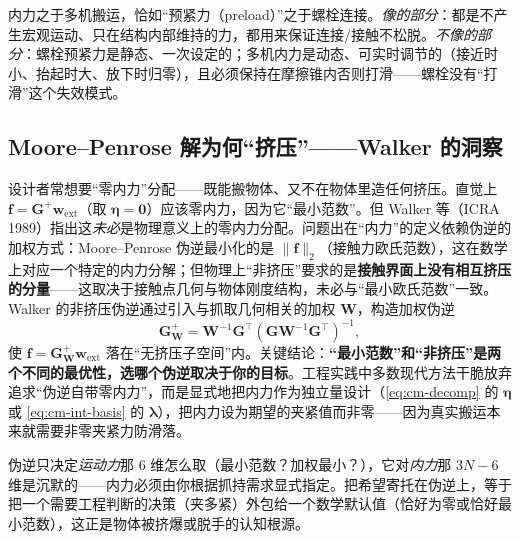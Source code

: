 \begin{note}
内力之于多机搬运，恰如“预紧力（preload）”之于螺栓连接。\emph{像的部分}：都是不产生宏观运动、只在结构内部维持的力，都用来保证连接/接触不松脱。\emph{不像的部分}：螺栓预紧力是静态、一次设定的；多机内力是动态、可实时调节的（接近时小、抬起时大、放下时归零），且必须保持在摩擦锥内否则打滑——螺栓没有“打滑”这个失效模式。
\end{note}

\subsection{Moore--Penrose 解为何“挤压”——Walker 的洞察}
\label{sec:cm-internal-walker}
设计者常想要“零内力”分配——既能搬物体、又不在物体里造任何挤压。直觉上 $\mathbf{f}=\mathbf{G}^{+}\mathbf{w}_{\text{ext}}$（取 $\boldsymbol{\eta}=\mathbf{0}$）应该零内力，因为它“最小范数”。但 Walker 等\cite{walker1988internal}（ICRA 1989）指出这\emph{未必}是物理意义上的零内力分配。问题出在“内力”的定义依赖伪逆的加权方式：Moore--Penrose 伪逆最小化的是 $\|\mathbf{f}\|_2$（接触力欧氏范数），这在数学上对应一个特定的内力分解；但物理上“非挤压”要求的是\textbf{接触界面上没有相互挤压的分量}——这取决于接触点几何与物体刚度结构，未必与“最小欧氏范数”一致。Walker 的非挤压伪逆通过引入与抓取几何相关的加权 $\mathbf{W}$，构造加权伪逆
\begin{equation}
  \mathbf{G}_{\mathbf{W}}^{+}=\mathbf{W}^{-1}\mathbf{G}^\top(\mathbf{G}\mathbf{W}^{-1}\mathbf{G}^\top)^{-1},
  \label{eq:cm-weighted-pinv}
\end{equation}
使 $\mathbf{f}=\mathbf{G}_{\mathbf{W}}^{+}\mathbf{w}_{\text{ext}}$ 落在“无挤压子空间”内。关键结论：\textbf{“最小范数”和“非挤压”是两个不同的最优性，选哪个伪逆取决于你的目标}。工程实践中多数现代方法干脆放弃追求“伪逆自带零内力”，而是显式地把内力作为独立量设计（\cref{eq:cm-decomp} 的 $\boldsymbol{\eta}$ 或 \cref{eq:cm-int-basis} 的 $\boldsymbol{\lambda}$），把内力设为期望的夹紧值而非零——因为真实搬运本来就需要非零夹紧力防滑落。

\begin{insight}
伪逆只决定\emph{运动力}那 $6$ 维怎么取（最小范数？加权最小？），它对\emph{内力}那 $3N-6$ 维是沉默的——内力必须由你根据抓持需求显式指定。把希望寄托在伪逆上，等于把一个需要工程判断的决策（夹多紧）外包给一个数学默认值（恰好为零或恰好最小范数），这正是物体被挤爆或脱手的认知根源。
\end{insight}

